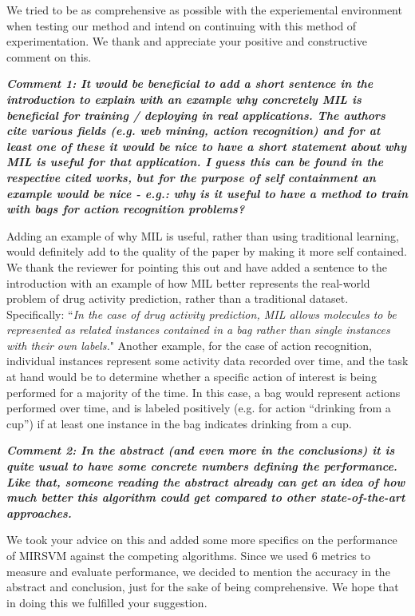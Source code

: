 \documentclass[a4paper,notitlepage]{article}
\begin{document}
\medskip

\noindent We tried to be as comprehensive as possible with the experiemental environment when testing our method and intend on continuing with this method of experimentation. We thank and appreciate your positive and constructive comment on this.

\noindent \textbf{\textit{Comment 1: It would be beneficial to add a short sentence in the introduction to explain with an example why concretely MIL is beneficial for training / deploying in real applications. The authors cite various fields (e.g. web mining, action recognition) and for at least one of these it would be nice to have a short statement about why MIL is useful for that application. I guess this can be found in the respective cited works, but for the purpose of self containment an example would be nice - e.g.: why is it useful to have a method to train with bags for action recognition problems?}}

\medskip

\noindent Adding an example of why MIL is useful, rather than using traditional learning, would definitely add to the quality of the paper by making it more self contained. We thank the reviewer for pointing this out and have added a sentence to the introduction with an example of how MIL better represents the real-world problem of drug activity prediction, rather than a traditional dataset. Specifically: ``\textit{In the case of drug activity prediction, MIL allows molecules to be represented as related instances contained in a bag rather than single instances with their own labels.}" Another example, for the case of action recognition, individual instances represent some activity data recorded over time, and the task at hand would be to determine whether a specific action of interest is being performed for a majority of the time. In this case, a bag would represent actions performed over time, and is labeled positively (e.g. for action ``drinking from a cup'') if at least one instance in the bag indicates drinking from a cup. 

\newpage
\noindent \textbf{\textit{Comment 2: In the abstract (and even more in the conclusions) it is quite usual to have some concrete numbers defining the performance. Like that, someone reading the abstract already can get an idea of how much better this algorithm could get compared to other state-of-the-art approaches.}}

\medskip

\noindent We took your advice on this and added some more specifics on the performance of MIRSVM against the competing algorithms. Since we used $6$ metrics to measure and evaluate performance, we decided to mention the accuracy in the abstract and conclusion, just for the sake of being comprehensive. We hope that in doing this we fulfilled your suggestion. 
\end{document}
